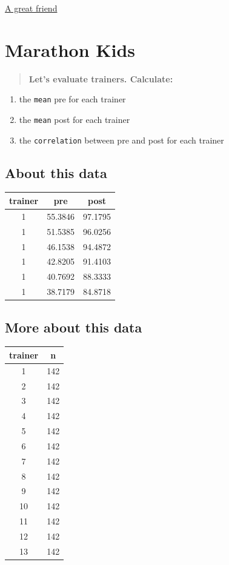 \documentclass[
]{book}
\providecommand{\tightlist}{%
  \setlength{\itemsep}{0pt}\setlength{\parskip}{0pt}}
\begin{document}
\href{https://doctors.prismahealth.org/provider/Megan+Malone+Schellinger/992715}{A great friend}

\hypertarget{marathon-kids}{%
\chapter{Marathon Kids}\label{marathon-kids}}

\begin{quote}
\textbf{Let's evaluate trainers. Calculate:}
\end{quote}

\begin{enumerate}
\def\labelenumi{\arabic{enumi}.}
\tightlist
\item
  the \texttt{mean} pre for each trainer
\item
  the \texttt{mean} post for each trainer
\item
  the \texttt{correlation} between pre and post for each trainer
\end{enumerate}

\hypertarget{about-this-data}{%
\section{About this data}\label{about-this-data}}

\begin{tabular}{c|c|c}
\hline
trainer & pre & post\\
\hline
1 & 55.3846 & 97.1795\\
\hline
1 & 51.5385 & 96.0256\\
\hline
1 & 46.1538 & 94.4872\\
\hline
1 & 42.8205 & 91.4103\\
\hline
1 & 40.7692 & 88.3333\\
\hline
1 & 38.7179 & 84.8718\\
\hline
\end{tabular}

\hypertarget{more-about-this-data}{%
\section{More about this data}\label{more-about-this-data}}

\begin{tabular}{c|c}
\hline
trainer & n\\
\hline
1 & 142\\
\hline
2 & 142\\
\hline
3 & 142\\
\hline
4 & 142\\
\hline
5 & 142\\
\hline
6 & 142\\
\hline
7 & 142\\
\hline
8 & 142\\
\hline
9 & 142\\
\hline
10 & 142\\
\hline
11 & 142\\
\hline
12 & 142\\
\hline
13 & 142\\
\hline
\end{tabular}
\end{document}

